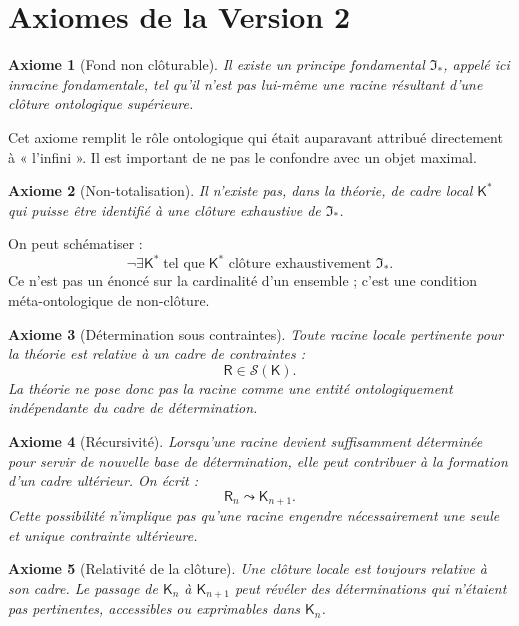 \documentclass[11pt,a4paper]{article}
\newtheorem{axiom}{Axiome}[section]
\newcommand{\Rac}{\mathsf{R}}
\newcommand{\Cadre}{\mathsf{K}}
\newcommand{\Sol}{\mathcal{S}}
\newcommand{\nextlev}{\leadsto}
\begin{document}
\section{Axiomes de la Version 2}

\begin{axiom}[Fond non clôturable]
Il existe un principe fondamental \(\mathfrak I_\ast\), appelé ici \emph{inracine
fondamentale}, tel qu'il n'est pas lui-même une racine résultant d'une clôture
ontologique supérieure.
\end{axiom}

Cet axiome remplit le rôle ontologique qui était auparavant attribué directement
à « l'infini ». Il est important de ne pas le confondre avec un objet maximal.

\begin{axiom}[Non-totalisation]
Il n'existe pas, dans la théorie, de cadre local \(\Cadre^{\ast}\) qui puisse être
identifié à une clôture exhaustive de \(\mathfrak I_\ast\).
\end{axiom}

On peut schématiser :
\[
\boxed{
\neg\exists \Cadre^{\ast}\;\text{tel que}\;
\Cadre^{\ast}\text{ clôture exhaustivement }\mathfrak I_\ast.
}
\]
Ce n'est pas un énoncé sur la cardinalité d'un ensemble ; c'est une condition
méta-ontologique de non-clôture.

\begin{axiom}[Détermination sous contraintes]
Toute racine locale pertinente pour la théorie est relative à un cadre de
contraintes :
\[
\Rac\in\Sol(\Cadre).
\]
La théorie ne pose donc pas la racine comme une entité ontologiquement
indépendante du cadre de détermination.
\end{axiom}

\begin{axiom}[Récursivité]
Lorsqu'une racine devient suffisamment déterminée pour servir de nouvelle base
de détermination, elle peut contribuer à la formation d'un cadre ultérieur.
On écrit :
\[
\Rac_n\nextlev\Cadre_{n+1}.
\]
Cette possibilité n'implique pas qu'une racine engendre nécessairement une
seule et unique contrainte ultérieure.
\end{axiom}

\begin{axiom}[Relativité de la clôture]
Une clôture locale est toujours relative à son cadre. Le passage de \(\Cadre_n\)
à \(\Cadre_{n+1}\) peut révéler des déterminations qui n'étaient pas pertinentes,
accessibles ou exprimables dans \(\Cadre_n\).
\end{axiom}
\end{document}
